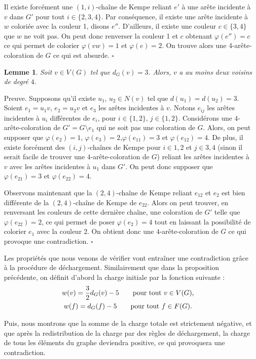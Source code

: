 \documentclass[10pt,a4paper]{article}
\newtheorem{lemme}{Lemme}
\newcommand{\ep}{{\hfill $\square$}}
\begin{document}
Il existe forcément une $(1,i)$-chaîne de Kempe reliant $e'$ à une arête incidente à $v$ dans $G'$ pour tout $i \in \{2,3,4\}$. Par conséquence, il existe une arête incidente à $w$ coloriée avec la couleur 1, disons $e''$. D'ailleurs, il existe une couleur $c\in \{3,4\}$ que $w$ ne voit pas. On peut donc renverser la couleur 1 et $c$ obtenant $\varphi(e'') = c$ ce qui permet de colorier $\varphi(vw) = 1$ et $\varphi(e) = 2$. On trouve alors une 4-arête-coloration de $G$ ce qui est absurde.
\ep

\begin{lemme}
Soit $v \in V(G)$ tel que $d_G(v)=3$. Alors, $v$ a au moins deux voisins de degré $4$.
\label{le:333}
\end{lemme}

Preuve.
Supposons qu'il existe $u_1$, $u_2 \in N(v)$ tel que $d(u_1) = d(u_2) = 3$. Soient $e_1 = u_1v$, $e_2 = u_2v$ et $e_3$ les arêtes incidentes à $v$. Notons $e_{ij}$ les arêtes incidentes à $u_i$ différentes de $e_i$, pour $i \in \{1,2\}$, $j \in \{1,2\}$. Considérons une $4$-arête-coloration de $G' = G \setminus e_1$ qui ne soit pas une coloration de $G$. Alors, on peut supposer que  $\varphi(e_2)=1$, $\varphi(e_3)=2$,$\varphi(e_{11})=3$ et $\varphi(e_{12})=4$. De plus, il existe forcément des $(i,j)$-chaînes de Kempe pour $i \in {1,2}$ et $j \in {3,4}$ (sinon il serait facile de trouver une $4$-arête-coloration de $G$) reliant les arêtes incidentes à $v$ avec les arêtes incidentes à $u_1$ dans $G'$. On peut donc supposer que $\varphi(e_{21})=3$ et $\varphi(e_{22})=4$.

Observons maintenant que la $(2,4)$-chaîne de Kempe reliant $e_{12}$ et $e_2$ est bien différente de la $(2,4)$-chaîne de Kempe de $e_{22}$. Alors on peut trouver, en renversant les couleurs de cette dernière chaîne, une coloration de $G'$ telle que $\varphi(e_{22}) = 2$, ce qui permet de poser $\varphi(e_2) = 4$ tout en laissant la possibilité de colorier $e_1$ avec la couleur 2. On obtient donc une $4$-arête-coloration de $G$ ce qui provoque une contradiction.
\ep


Les propriétés que nous venons de vérifier vont entraîner une contradiction grâce à la procédure de déchargement. Similairement que dans la proposition précédente, on définit d'abord la charge initiale par la fonction suivante :
$$
\gathered
w(v) = \frac{3}{2} d_G(v) - 5 \qquad \textrm{pour tout $v\in V(G)$,} \\
w(f) = d_G(f) - 5 \qquad \textrm{pour tout $f\in F(G)$.}
\endgathered
$$

Puis, nous montrons que la somme de la charge totale est strictement négative, et que après la redistribution de la charge par des règles de déchargement, la charge de tous les éléments du graphe deviendra positive, ce qui provoquera une contradiction.
\end{document}
